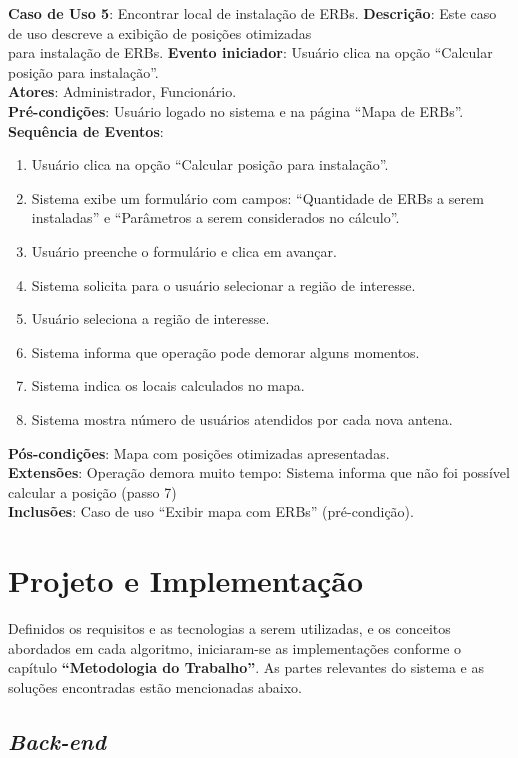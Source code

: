 \documentclass[]{politex}
\begin{document}
\noindent \textbf{Caso de Uso 5}: Encontrar local de instalação de ERBs.
\textbf{Descrição}: Este caso de uso descreve a exibição de posições otimizadas \\
para instalação de ERBs.
\textbf{Evento iniciador}: Usuário clica na opção ``Calcular posição para instalação''. \\
\textbf{Atores}: Administrador, Funcionário. \\
\textbf{Pré-condições}: Usuário logado no sistema e na página ``Mapa de ERBs''. \\
\textbf{Sequência de Eventos}:
\begin{enumerate}
\item Usuário clica na opção ``Calcular posição para instalação''.
\item Sistema exibe um formulário com campos: ``Quantidade de ERBs a serem
instaladas'' e ``Parâmetros a serem considerados no cálculo''.
\item Usuário preenche o formulário e clica em avançar.
\item Sistema solicita para o usuário selecionar a região de interesse.
\item Usuário seleciona a região de interesse.
\item Sistema informa que operação pode demorar alguns momentos.
\item Sistema indica os locais calculados no mapa.
\item Sistema mostra número de usuários atendidos por cada nova antena.
\end{enumerate}
\textbf{Pós-condições}: Mapa com posições otimizadas apresentadas. \\
\textbf{Extensões}: Operação demora muito tempo: Sistema informa que não foi
possível calcular a posição (passo 7) \\
\textbf{Inclusões}: Caso de uso ``Exibir mapa com ERBs'' (pré-condição). \\

\chapter{Projeto e Implementação}

Definidos os requisitos e as tecnologias a serem utilizadas, e os conceitos
abordados em cada algoritmo, iniciaram-se as implementações conforme o capítulo
\textbf{``Metodologia do Trabalho''}. As partes relevantes do sistema e as
soluções encontradas estão mencionadas abaixo.

\section{\textit{Back-end}}
\end{document}
